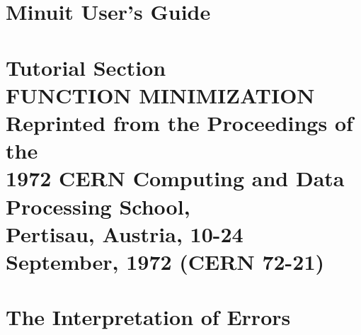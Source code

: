 \def\@endpart{\vfil\newpage
   \if@twoside
       \hbox{}%
       \thispagestyle{empty}%
       \newpage
   \fi
   \if@tempswa
     \twocolumn
   \fi}
\makeatother


\setcounter{page}{1}
\part{Minuit User's Guide}






\part[Tutorial Section]{Tutorial Section\\[1cm]
\Large         FUNCTION MINIMIZATION \\[5mm]
        Reprinted from the Proceedings of the \\[5mm]
  1972 CERN Computing and Data Processing School, \\[4mm]
 Pertisau, Austria, 10-24 September, 1972 (CERN 72-21)}

\part{The Interpretation of Errors}





